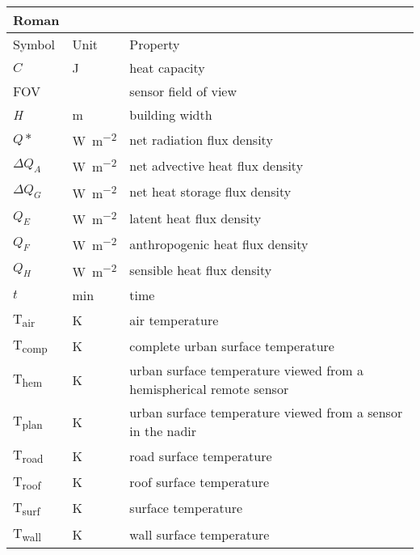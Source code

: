 \begin{table}[H]
	\centering
	\begin{tabular}{p{1.5cm}p{2cm}p{10cm}}
		Roman &&\\
		\toprule
		
		Symbol & Unit & Property \\
		\midrule
		$C$ & \si{\joule} & heat capacity \\
		FOV & \si{\deg} & sensor field of view \\
		\textit{H} & \si{\meter} & building width \\
		$Q*$ & \si{\watt\per\square\meter} & net radiation flux density \\
		$\Delta Q_A$ & \si{\watt\per\square\meter} & net advective heat flux density \\
		$\Delta Q_G$ & \si{\watt\per\square\meter} & net heat storage flux density \\
		$Q_E$ & \si{\watt\per\square\meter} & latent heat flux density \\
		$Q_F$ & \si{\watt\per\square\meter} & anthropogenic heat flux density \\
		$Q_H$ & \si{\watt\per\square\meter} & sensible heat flux density \\
		$t$ & \si{\minute} & time \\
		T\textsubscript{air} & \si{\kelvin} & air temperature \\
		T\textsubscript{comp} & \si{\kelvin} & complete urban surface temperature\\
		T\textsubscript{hem} & \si{\kelvin} & urban surface temperature viewed from a hemispherical remote sensor\\
		T\textsubscript{plan} & \si{\kelvin} & urban surface temperature viewed from a sensor in the nadir\\
		T\textsubscript{road} & \si{\kelvin} &road surface temperature\\
		T\textsubscript{roof} & \si{\kelvin} & roof surface temperature \\
		T\textsubscript{surf} & \si{\kelvin} & surface temperature \\
		T\textsubscript{wall} & \si{\kelvin} & wall surface temperature\\
		
		
		

\end{tabular}
\end{table}
